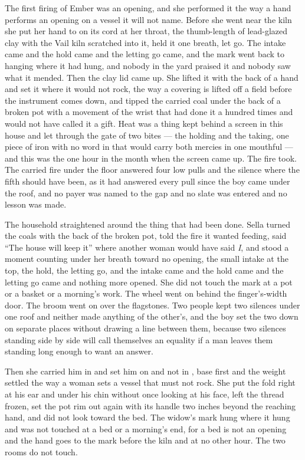 The first firing of Ember was an opening, and she performed it the way a hand performs an opening on a vessel it will not name. Before she went near the kiln she put her hand to  on its cord at her throat, the thumb-length of lead-glazed clay with the Vail kiln scratched into it, held it one breath, let go. The intake came and the hold came and the letting go came, and the mark went back to hanging where it had hung, and nobody in the yard praised it and nobody saw what it mended. Then the clay lid came up. She lifted it with the back of a hand and set it where it would not rock, the way a covering is lifted off a field before the instrument comes down, and tipped the carried coal under the back of a broken pot with a movement of the wrist that had done it a hundred times and would not have called it a gift. Heat was a thing kept behind a screen in this house and let through the gate of two bites --- the holding and the taking, one piece of  iron with no word in  that would carry both mercies in one mouthful --- and this was the one hour in the month when the screen came up. The fire took. The carried fire under the floor answered four low pulls and the silence where the fifth should have been, as it had answered every pull since the boy came under the roof, and no payer was named to the gap and no slate was entered and no lesson was made.

The household straightened around the thing that had been done. Sella turned the coals with the back of the broken pot, told the fire it wanted feeding, said “The house will keep it” where another woman would have said \emph{I}, and stood a moment counting under her breath toward no opening, the small intake at the top, the hold, the letting go, and the intake came and the hold came and the letting go came and nothing more opened. She did not touch the mark at a pot or a basket or a morning's work. The wheel went on behind the finger's-width door. The broom went on over the flagstones. Two people kept two silences under one roof and neither made anything of the other's, and the boy set the two down on separate places without drawing a line between them, because two silences standing side by side will call themselves an equality if a man leaves them standing long enough to want an answer.

Then she carried him in and set him on  and not in , base first and the weight settled the way a woman sets a vessel that must not rock. She put the fold right at his ear and under his chin without once looking at his face, left the thread frozen, set the pot rim out again with its handle two inches beyond the reaching hand, and did not look toward the bed. The widow's mark hung where it hung and was not touched at a bed or a morning's end, for a bed is not an opening and the hand goes to the mark before the kiln and at no other hour. The two rooms do not touch.

